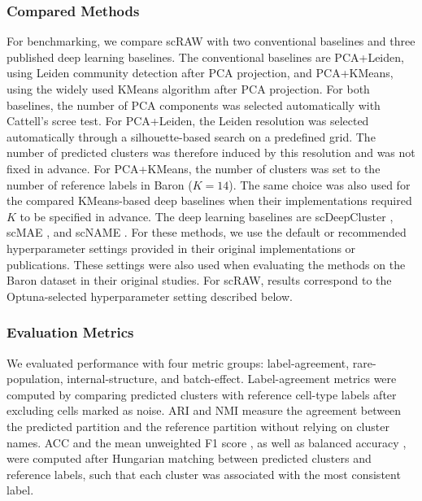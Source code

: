 \documentclass[11pt,a4paper]{article}
\begin{document}
\subsubsection*{Compared Methods}

For benchmarking, we compare scRAW with two conventional baselines and
three published deep learning baselines. The conventional baselines are
PCA+Leiden, using Leiden community detection \cite{traag2019} after PCA
projection, and PCA+KMeans, using the widely used KMeans algorithm
\cite{macqueen1967} after PCA projection. For both baselines, the number
of PCA components was selected automatically with Cattell's scree test.
For PCA+Leiden, the Leiden resolution was selected automatically through
a silhouette-based search on a predefined
grid. The number of predicted clusters was therefore induced by this
resolution and was not fixed in advance. For PCA+KMeans, the number of
clusters was set to the number of reference labels in Baron
($K = 14$). The same choice was also used for the compared KMeans-based
deep baselines when their implementations required $K$ to be specified
in advance.
The deep learning baselines
are scDeepCluster \cite{tian2019}, scMAE \cite{fang2024}, and scNAME
\cite{wan2022}. 
For these methods, we use the default or recommended hyperparameter settings provided in their original implementations or publications. These settings were also used when evaluating the methods on the Baron dataset in their original studies. For scRAW, results correspond to the Optuna-selected hyperparameter setting described below.

\subsubsection*{Evaluation Metrics}

We evaluated performance with four metric groups: label-agreement, rare-population, internal-structure, and
batch-effect. Label-agreement metrics were computed by
comparing predicted clusters with reference cell-type labels after
excluding cells marked as noise. ARI \cite{hubert1985} and NMI
\cite{vinh2010} measure the agreement between the predicted partition
and the reference partition without relying on cluster names. ACC and
the mean unweighted F1 score \cite{sokolova2009}, as well as balanced accuracy
\cite{brodersen2010}, were computed after Hungarian matching between
predicted clusters and reference labels, such that each cluster was
associated with the most consistent label.
\end{document}
